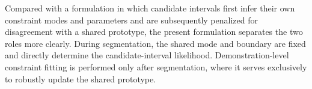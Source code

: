 \documentclass[lettersize,journal]{IEEEtran}
\begin{document}
Compared with a formulation in which candidate intervals first infer their own constraint modes and parameters and are subsequently penalized for disagreement with a shared prototype, the present formulation separates the two roles more clearly. During segmentation, the shared mode and boundary are fixed and directly determine the candidate-interval likelihood. Demonstration-level constraint fitting is performed only after segmentation, where it serves exclusively to robustly update the shared prototype.

\end{document}
